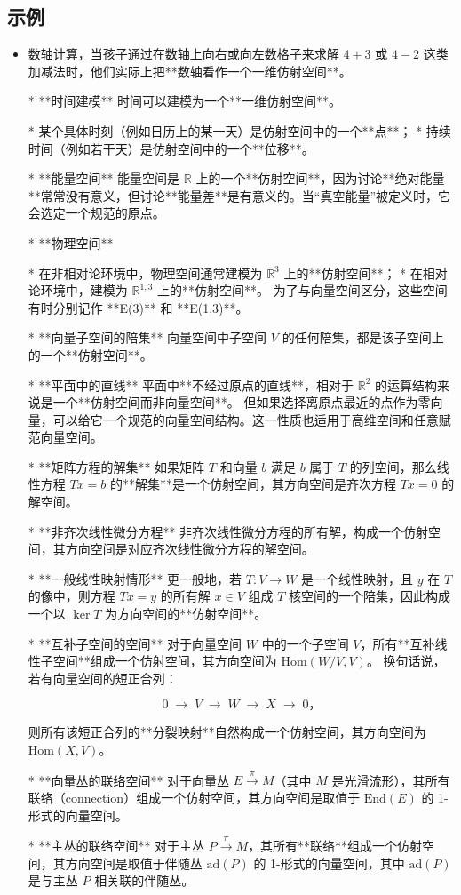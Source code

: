 \subsection{示例}
\begin{itemize}
\item 数轴计算，当孩子通过在数轴上向右或向左数格子来求解 $4 + 3$ 或 $4 - 2$ 这类加减法时，他们实际上把**数轴看作一个一维仿射空间**。

* **时间建模**
  时间可以建模为一个**一维仿射空间**。

  * 某个具体时刻（例如日历上的某一天）是仿射空间中的一个**点**；
  * 持续时间（例如若干天）是仿射空间中的一个**位移**。

* **能量空间**
  能量空间是 $\mathbb{R}$ 上的一个**仿射空间**，因为讨论**绝对能量**常常没有意义，但讨论**能量差**是有意义的。当“真空能量”被定义时，它会选定一个规范的原点。

* **物理空间**

  * 在非相对论环境中，物理空间通常建模为 $\mathbb{R}^3$ 上的**仿射空间**；
  * 在相对论环境中，建模为 $\mathbb{R}^{1,3}$ 上的**仿射空间**。
    为了与向量空间区分，这些空间有时分别记作 **E(3)** 和 **E(1,3)**。

* **向量子空间的陪集**
  向量空间中子空间 $V$ 的任何陪集，都是该子空间上的一个**仿射空间**。

* **平面中的直线**
  平面中**不经过原点的直线**，相对于 $\mathbb{R}^2$ 的运算结构来说是一个**仿射空间而非向量空间**。
  但如果选择离原点最近的点作为零向量，可以给它一个规范的向量空间结构。这一性质也适用于高维空间和任意赋范向量空间。

* **矩阵方程的解集**
  如果矩阵 $T$ 和向量 $b$ 满足 $b$ 属于 $T$ 的列空间，那么线性方程 $Tx = b$ 的**解集**是一个仿射空间，其方向空间是齐次方程 $Tx = 0$ 的解空间。

* **非齐次线性微分方程**
  非齐次线性微分方程的所有解，构成一个仿射空间，其方向空间是对应齐次线性微分方程的解空间。

* **一般线性映射情形**
  更一般地，若 $T: V \to W$ 是一个线性映射，且 $y$ 在 $T$ 的像中，则方程 $Tx = y$ 的所有解 $x \in V$ 组成 $T$ 核空间的一个陪集，因此构成一个以 $\ker T$ 为方向空间的**仿射空间**。

* **互补子空间的空间**
  对于向量空间 $W$ 中的一个子空间 $V$，所有**互补线性子空间**组成一个仿射空间，其方向空间为 $\text{Hom}(W/V, V)$。
  换句话说，若有向量空间的短正合列：

  $$
  0 \;\longrightarrow\; V \;\longrightarrow\; W \;\longrightarrow\; X \;\longrightarrow\; 0，
  $$

  则所有该短正合列的**分裂映射**自然构成一个仿射空间，其方向空间为 $\text{Hom}(X, V)$。

* **向量丛的联络空间**
  对于向量丛 $E \xrightarrow{\pi} M$（其中 $M$ 是光滑流形），其所有\*\*联络（connection）\*\*组成一个仿射空间，其方向空间是取值于 $\text{End}(E)$ 的 1-形式的向量空间。

* **主丛的联络空间**
  对于主丛 $P \xrightarrow{\pi} M$，其所有**联络**组成一个仿射空间，其方向空间是取值于伴随丛 $\text{ad}(P)$ 的 1-形式的向量空间，其中 $\text{ad}(P)$ 是与主丛 $P$ 相关联的伴随丛。

\end{itemize}